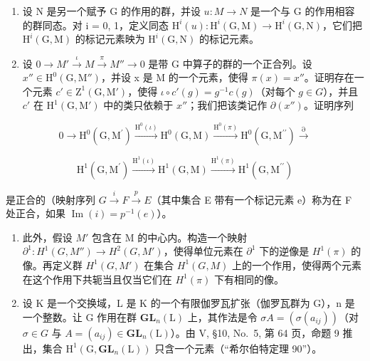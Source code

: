 \begin{enumerate}
\def\labelenumi{\alph{enumi})}
\item
  设 N 是另一个赋予 G 的作用的群，并设 \(u: M \to N\) 是一个与 G 的作用相容的群同态。对 i = 0, 1，定义同态 \(\mathrm{H}^{i}(u): \mathrm{H}^{i}(\mathrm{G}, \mathrm{M}) \to \mathrm{H}^{i}(\mathrm{G}, \mathrm{N})\)，它们把 \(\mathrm{H}^{i}(\mathrm{G}, \mathrm{M})\) 的标记元素映为 \(\mathrm{H}^{i}(\mathrm{G}, \mathrm{N})\) 的标记元素。
\item
  设 \(0 \to M' \xrightarrow{\iota} M \xrightarrow{\pi} M'' \to 0\) 是带 G 中算子的群的一个正合列。设 \(x'' \in \mathrm{H}^0(\mathrm{G}, \mathrm{M}'')\)，并设 x 是 M 的一个元素，使得 \(\pi(x) = x''\)。证明存在一个元素 \(c' \in \mathrm{Z}^1(\mathrm{G}, \mathrm{M}')\)，使得 \(\iota \circ c'(g) = g^{-1}c(g)\)（对每个 \(g \in G\)），并且 \(c'\) 在 \(\mathrm{H}^1(\mathrm{G}, \mathrm{M}')\) 中的类只依赖于 \(x''\)；我们把该类记作 \(\partial(x'')\)。证明序列
\end{enumerate}

\[
0 \to \mathrm{H} ^ {0} (\mathrm{G}, \mathrm{M} ^ {\prime}) \xrightarrow {\mathrm{H} ^ {0} (\iota)} \mathrm{H} ^ {0} (\mathrm{G}, \mathrm{M}) \xrightarrow {\mathrm{H} ^ {0} (\pi)} \mathrm{H} ^ {0} (\mathrm{G}, \mathrm{M} ^ {\prime \prime}) \xrightarrow {\partial}
\]

\[
\mathrm{H} ^ {1} (\mathrm{G}, \mathrm{M} ^ {\prime}) \xrightarrow {\mathrm{H} ^ {1} (\iota)} \mathrm{H} ^ {1} (\mathrm{G}, \mathrm{M}) \xrightarrow {\mathrm{H} ^ {1} (\pi)} \mathrm{H} ^ {1} (\mathrm{G}, \mathrm{M} ^ {\prime \prime})
\]

是正合的（映射序列 \(G \xrightarrow{i} F \xrightarrow{p} E\)（其中集合 E 带有一个标记元素 e）称为在 F 处正合，如果 \(\operatorname{Im}(i) = p^{-1}(e)\)）。

\begin{enumerate}
\def\labelenumi{\alph{enumi})}
\setcounter{enumi}{2}
\item
  此外，假设 \(M'\) 包含在 M 的中心内。构造一个映射 \(\partial^{1}: H^{1}(G, M'') \to H^{2}(G, M')\)，使得单位元素在 \(\partial^{1}\) 下的逆像是 \(H^{1}(\pi)\) 的像。再定义群 \(H^{1}(G, M')\) 在集合 \(H^{1}(G, M)\) 上的一个作用，使得两个元素在这个作用下共轭当且仅当它们在 \(H^{1}(\pi)\) 下有相同的像。
\item
  设 K 是一个交换域，L 是 K 的一个有限伽罗瓦扩张（伽罗瓦群为 G），n 是一个整数。让 G 作用在群 \(\mathbf{GL}_{n}(\mathrm{L})\) 上，其作法是令 \(\sigma A = (\sigma(a_{ij}))\)（对 \(\sigma \in G\) 与 \(A = (a_{ij}) \in \mathbf{GL}_{n}(\mathrm{L})\)）。由 V, §10, No.~5, 第 64 页，命题 9 推出，集合 \(\mathrm{H}^{1}(\mathrm{G}, \mathbf{GL}_{n}(\mathrm{L}))\) 只含一个元素（“希尔伯特定理 90”）。
\end{enumerate}

